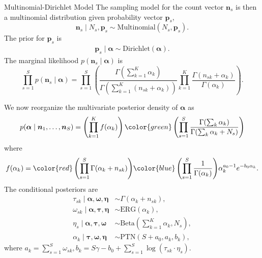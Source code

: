 \documentclass[10pt]{beamer}
\theoremstyle{remark}
\theoremstyle{definition}
\begin{document}
\begin{frame}{Multinomial-Dirichlet Model}
The sampling model for the count vector $\bm{n}_s$ is then a multinomial distribution given probability vector $\bm{p}_s$,
\begin{equation*}
\bm{n}_s \mid N_s, \bm{p}_s  \sim \text{Multinomial}\left(N_s, \bm{p}_s\right).
\end{equation*}
The prior for $\bm{p}_s$ is 
\begin{align*}
\bm{p}_s \mid \bm{\alpha} \sim \text{Dirichlet}\left(\bm{\alpha}\right).
\end{align*}
The marginal likelihood $p\left(\bm{n}_s \mid \bm{\alpha}\right)$ is
\begin{equation*}
\prod_{s=1}^S p\left(\bm{n}_s \mid \bm{\alpha}\right) = \prod_{s=1}^S \left(\frac{\Gamma\left(\sum_{k=1}^K \alpha_k\right)}{\Gamma\left(\sum_{k=1}^K \left(n_{sk} + \alpha_k\right)\right)} \prod_{k=1}^K \frac{\Gamma\left(n_{sk} + \alpha_k\right)}{\Gamma\left(\alpha_k\right)}\right).
\end{equation*}
\end{frame}

\begin{frame}
We now reorganize the multivariate posterior density of $\bm\alpha$ as
\begin{equation*}
p(\bm{\alpha} \mid \bm{n}_1, \ldots, \bm{n}_S) = \left(\prod_{k=1}^K f(\alpha_k)\right){\color{green}\left(\prod_{s=1}^S \frac{\Gamma(\sum_k \alpha_k)}{\Gamma(\sum_k \alpha_k + N_s)}\right)} 
\end{equation*}
where 
\begin{equation*}\label{eqn:falpha}
f(\alpha_k) ={\color{red}\left(\prod_{s=1}^S\Gamma( \alpha_k + n_{sk})\right)} {\color{blue}\left(\prod_{s=1}^S \frac{1}{\Gamma(\alpha_k)}\right)}   \alpha_k^{a_0-1}e^{-b_0\alpha_k}.
\end{equation*}
The conditional posteriors are
\begin{align*}
\tau_{sk} \mid \bm{\alpha, \omega, \eta} &\sim \Gamma(\alpha_k+n_{sk}), \\
\omega_{sk} \mid \bm{\alpha, \tau, \eta} &\sim \text{ERG}(\alpha_k), \\
\eta_s \mid \bm{\alpha, \tau, \omega} &\sim \text{Beta}\left(\sum_{k=1}^K \alpha_k, N_s\right),\\
\alpha_k \mid \bm{\tau, \omega, \eta} &\sim \text{PTN}(S + a_0, a_k, b_k),
\end{align*}
where $a_k=\sum_{s=1}^S \omega_{sk}, b_k = S\gamma - b_0 + \sum_{s=1}^S\log(\tau_{sk}\cdot\eta_s)$. 
\end{frame}
\end{document}
